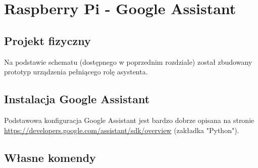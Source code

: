 \section{Raspberry Pi - Google Assistant}

\subsection{Projekt fizyczny}

Na podstawie schematu (dostępnego w poprzednim rozdziale) został zbudowany prototyp urządzenia pełniącego rolę asystenta.

\subsection{Instalacja Google Assistant}

Podstawowa konfiguracja Google Assistant jest bardzo dobrze opisana na stronie \url{https://developers.google.com/assistant/sdk/overview} (zakładka "Python").

\subsection{Własne komendy}




